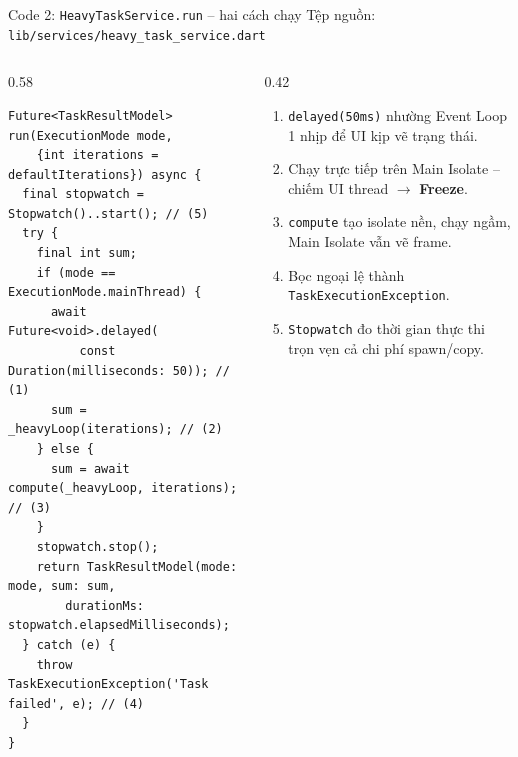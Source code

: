 \documentclass[aspectratio=169,11pt]{beamer}
\newcommand{\cnum}[1]{\textcolor{purpD}{\textbf{(#1)}}}
\begin{document}
\begin{frame}[fragile]{Code 2: \texttt{HeavyTaskService.run} -- hai cách chạy}
  \vspace{-0.25cm}
  {\scriptsize\color{grayD} Tệp nguồn: \texttt{lib/services/heavy\_task\_service.dart}}
  \vspace{0.05cm}
  \begin{columns}[T]
    \begin{column}{0.58\textwidth}
\begin{lstlisting}[basicstyle=\ttfamily\fontsize{6pt}{7pt}\selectfont]
Future<TaskResultModel> run(ExecutionMode mode,
    {int iterations = defaultIterations}) async {
  final stopwatch = Stopwatch()..start(); // (5)
  try {
    final int sum;
    if (mode == ExecutionMode.mainThread) {
      await Future<void>.delayed(
          const Duration(milliseconds: 50)); // (1)
      sum = _heavyLoop(iterations); // (2)
    } else {
      sum = await compute(_heavyLoop, iterations); // (3)
    }
    stopwatch.stop();
    return TaskResultModel(mode: mode, sum: sum,
        durationMs: stopwatch.elapsedMilliseconds);
  } catch (e) {
    throw TaskExecutionException('Task failed', e); // (4)
  }
}
\end{lstlisting}
    \end{column}
    \begin{column}{0.42\textwidth}
      \scriptsize
      \begin{enumerate}
        \setlength{\itemsep}{0.08cm}
        \item[\cnum{1}] \texttt{delayed(50ms)} nhường Event Loop 1 nhịp để UI kịp vẽ trạng thái.
        \item[\cnum{2}] Chạy trực tiếp trên Main Isolate -- chiếm UI thread $\rightarrow$ \textbf{Freeze}.
        \item[\cnum{3}] \texttt{compute} tạo isolate nền, chạy ngầm, Main Isolate vẫn vẽ frame.
        \item[\cnum{4}] Bọc ngoại lệ thành \texttt{TaskExecutionException}.
        \item[\cnum{5}] \texttt{Stopwatch} đo thời gian thực thi trọn vẹn cả chi phí spawn/copy.
      \end{enumerate}
    \end{column}
  \end{columns}
\end{frame}
\end{document}
